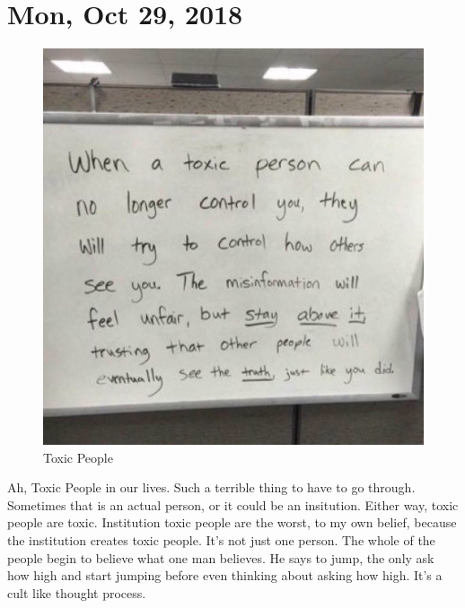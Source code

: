 \section{Mon, Oct 29, 2018}

\begin{figure}[h!]
  \centering
  \includegraphics[width=.5\linewidth]{2018/images/toxic.jpg}
  \caption{Toxic People}
  \label{fig:rabbit}
\end{figure}

Ah, Toxic People in our lives. Such a terrible thing to have to go through. Sometimes
that is an actual person, or it could be an insitution. Either way, toxic people are
toxic. Institution toxic people are the worst, to my own belief, because the
institution creates toxic people. It's not just one person. The whole of the people
begin to believe what one man believes. He says to jump, the only ask how high and
start jumping before even thinking about asking how high. It's a cult like thought
process.